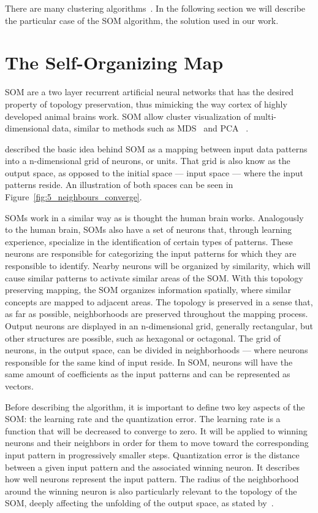 There are many clustering algorithms~\cite{hartigan}. In the following section we will describe the particular case of the \ac{SOM} algorithm, the solution used in our work.

\section{The Self-Organizing Map} 
\label{sec:the_self_organizing_map}

\ac{SOM} are a two layer recurrent artificial neural networks that has the desired property of topology preservation, thus mimicking the way cortex of highly developed animal brains work. \ac{SOM} allow cluster visualization of multi-dimensional data, similar to methods such as \ac{MDS}~\cite{KruskalWish1978} and \ac{PCA}~\cite{Hotelling_1933} .  

\citet{Bacao2005} described the basic idea behind \ac{SOM} as a mapping between input data patterns into a n-dimensional grid of neurons, or units. That grid is also know as the output space, as opposed to the initial space --- input space --- where the input patterns reside. An illustration of both spaces can be seen in Figure~\ref{fig:5_neighbours_converge}.

SOMs work in a similar way as is thought the human brain works. Analogously to the human brain, SOMs also have a set of neurons that, through learning experience, specialize in the identification of certain types of patterns. These neurons are responsible for categorizing the input patterns for which they are responsible to identify. Nearby neurons will be organized by similarity, which will cause similar patterns to activate similar areas of the \ac{SOM}.
With this topology preserving mapping, the \ac{SOM} organizes information spatially, where similar concepts are mapped to adjacent areas. The topology is preserved in a sense that, as far as possible, neighborhoods are preserved throughout the mapping process.
Output neurons are displayed in an n-dimensional grid, generally rectangular, but other structures are possible, such as hexagonal or octagonal.  The grid of neurons, in the output space, can be divided in neighborhoods --- where neurons responsible for the same kind of input reside.
In \ac{SOM}, neurons will have the same amount of coefficients as the input patterns and can be represented as vectors.

Before describing the algorithm, it is important to define two key aspects of the \ac{SOM}: the learning rate and the quantization error. The learning rate is a function that will be decreased to converge to zero. It will be applied to winning neurons and their neighbors in order for them to move toward the corresponding input pattern in progressively smaller steps. Quantization error is the distance between a given input pattern and the associated winning neuron. It describes how well neurons represent the input pattern. The radius of the neighborhood around the winning neuron is also particularly relevant to the topology of the \ac{SOM}, deeply affecting the unfolding of the output space, as stated by~\citet{Bacao2005}. 

